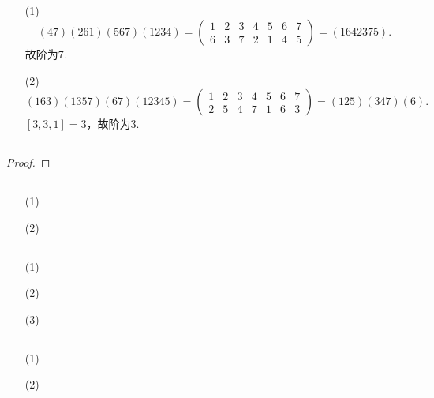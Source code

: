 \documentclass[UTF8]{ctexart}
\begin{document}
\subsection{}   %
\begin{enumerate}
    \item [(1)]
    \[
        (47)(261)(567)(1234)
        =
        \begin{pmatrix}
            1 & 2 & 3 & 4 & 5 & 6 & 7\\
            6 & 3 & 7 & 2 & 1 & 4 & 5
        \end{pmatrix}   
        =
        (1642375). 
    \]
    故阶为7.
    \item [(2)]
    \[
        (163) (1357) (67) (12345)   
        =
        \begin{pmatrix}
            1 & 2 & 3 & 4 & 5 & 6 & 7\\
            2 & 5 & 4 & 7 & 1 & 6 & 3
        \end{pmatrix}
        =
        (125)(347)(6). 
    \]
    $[3,3,1]=3$，故阶为3.
\end{enumerate}

\subsection{}   %
\begin{proof}
    
\end{proof}

\subsection{}   %
\begin{enumerate}
    \item [(1)]
    \item [(2)]
\end{enumerate}

\subsection{}   %
\begin{enumerate}
    \item [(1)]
    \item [(2)]
    \item [(3)]
\end{enumerate}

\subsection{}   %
\begin{enumerate}
    \item [(1)]
    \item [(2)]
\end{enumerate}
\end{document}
